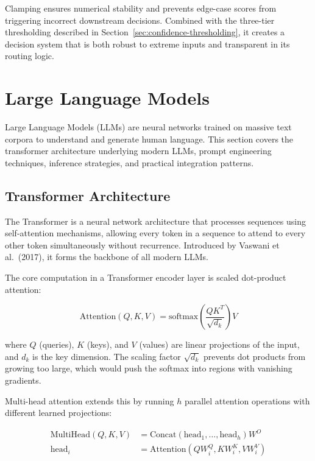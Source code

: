 \documentclass[10pt,a4paper]{article}
\begin{document}
Clamping ensures numerical stability and prevents edge-case scores from triggering incorrect downstream decisions. Combined with the three-tier thresholding described in Section~\ref{sec:confidence-thresholding}, it creates a decision system that is both robust to extreme inputs and transparent in its routing logic.

\section{Large Language Models}
\label{sec:llms}

Large Language Models (LLMs) are neural networks trained on massive text corpora to understand and generate human language. This section covers the transformer architecture underlying modern LLMs, prompt engineering techniques, inference strategies, and practical integration patterns.

\subsection{Transformer Architecture}
\label{sec:transformer}

The Transformer is a neural network architecture that processes sequences using self-attention mechanisms, allowing every token in a sequence to attend to every other token simultaneously without recurrence. Introduced by Vaswani et al.\ (2017), it forms the backbone of all modern LLMs.

The core computation in a Transformer encoder layer is scaled dot-product attention:

\begin{equation}
\text{Attention}(Q, K, V) = \text{softmax}\left(\frac{QK^T}{\sqrt{d_k}}\right)V
\label{eq:attention}
\end{equation}

where $Q$ (queries), $K$ (keys), and $V$ (values) are linear projections of the input, and $d_k$ is the key dimension. The scaling factor $\sqrt{d_k}$ prevents dot products from growing too large, which would push the softmax into regions with vanishing gradients.

Multi-head attention extends this by running $h$ parallel attention operations with different learned projections:

\begin{align}
\text{MultiHead}(Q, K, V) &= \text{Concat}(\text{head}_1, \ldots, \text{head}_h)W^O \label{eq:multihead-1} \\
\text{head}_i &= \text{Attention}(QW_i^Q, KW_i^K, VW_i^V) \label{eq:multihead-2}
\end{align}
\end{document}
